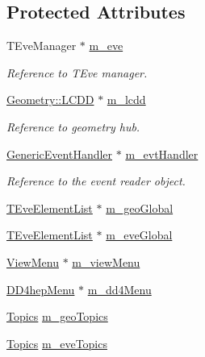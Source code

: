 \subsection*{Protected Attributes}
\begin{DoxyCompactItemize}
\item 
T\+Eve\+Manager $\ast$ \hyperlink{class_d_d4hep_1_1_display_a22aad63fdd7d2db0720957c9117ee794}{m\+\_\+eve}
\begin{DoxyCompactList}\small\item\em Reference to T\+Eve manager. \end{DoxyCompactList}\item 
\hyperlink{class_d_d4hep_1_1_geometry_1_1_l_c_d_d}{Geometry\+::\+L\+C\+DD} $\ast$ \hyperlink{class_d_d4hep_1_1_display_a829bb86fd3460a74ca1da6c51e2802ef}{m\+\_\+lcdd}
\begin{DoxyCompactList}\small\item\em Reference to geometry hub. \end{DoxyCompactList}\item 
\hyperlink{class_d_d4hep_1_1_generic_event_handler}{Generic\+Event\+Handler} $\ast$ \hyperlink{class_d_d4hep_1_1_display_a7b83daeea2f4100c2ce0d92d0f417ed7}{m\+\_\+evt\+Handler}
\begin{DoxyCompactList}\small\item\em Reference to the event reader object. \end{DoxyCompactList}\item 
\hyperlink{class_t_eve_element_list}{T\+Eve\+Element\+List} $\ast$ \hyperlink{class_d_d4hep_1_1_display_ad140be1ce0ad3e94e165623d66e16dca}{m\+\_\+geo\+Global}
\item 
\hyperlink{class_t_eve_element_list}{T\+Eve\+Element\+List} $\ast$ \hyperlink{class_d_d4hep_1_1_display_a8d60b9f25c9907af4f9efa64363d8c85}{m\+\_\+eve\+Global}
\item 
\hyperlink{class_d_d4hep_1_1_view_menu}{View\+Menu} $\ast$ \hyperlink{class_d_d4hep_1_1_display_a363cb8c67d3fafa5a0847b3ad71dba05}{m\+\_\+view\+Menu}
\item 
\hyperlink{class_d_d4hep_1_1_d_d4hep_menu}{D\+D4hep\+Menu} $\ast$ \hyperlink{class_d_d4hep_1_1_display_ac5b8a0eed40113e808530571cfe5b9ca}{m\+\_\+dd4\+Menu}
\item 
\hyperlink{class_d_d4hep_1_1_display_ab7cf442eb2211f57f55b7cd1cf8a61c1}{Topics} \hyperlink{class_d_d4hep_1_1_display_ade13a0eaa5fa83f5cf64f14ed7d3ef0d}{m\+\_\+geo\+Topics}
\item 
\hyperlink{class_d_d4hep_1_1_display_ab7cf442eb2211f57f55b7cd1cf8a61c1}{Topics} \hyperlink{class_d_d4hep_1_1_display_a2b79f980245e444a7d9e70d09b043e07}{m\+\_\+eve\+Topics}

\end{DoxyCompactItemize}
